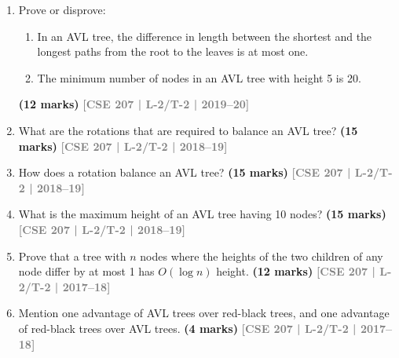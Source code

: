 \documentclass[12pt]{article}
\newcommand{\yr}[1]{\hfill\textcolor{gray}{\small\textbf{[#1]}}}
\newcommand{\mk}[1]{\textcolor{orange!70!black}{\small\textbf{(#1 marks)}}}
\begin{document}
\begin{enumerate}
\begin{center}
\end{center}
\mk{10} \yr{CSE 207 | L-2/T-2 | 2020--21}


\item Prove or disprove: 
\begin{enumerate}
\item In an AVL tree, the difference in length between the shortest and the longest paths from the root to the leaves is at most one.
\item The minimum number of nodes in an AVL tree with height 5 is 20.
\end{enumerate}
\mk{12} \yr{CSE 207 | L-2/T-2 | 2019--20}


\item What are the rotations that are required to balance an AVL tree?
\mk{15} \yr{CSE 207 | L-2/T-2 | 2018--19}


\item How does a rotation balance an AVL tree?
\mk{15} \yr{CSE 207 | L-2/T-2 | 2018--19}


\item What is the maximum height of an AVL tree having 10 nodes?
\mk{15} \yr{CSE 207 | L-2/T-2 | 2018--19}


\item Prove that a tree with $n$ nodes where the heights of the two children of any node differ by at most 1 has $O(\log n)$ height. \mk{12}
\yr{CSE 207 | L-2/T-2 | 2017--18}


\item Mention one advantage of AVL trees over red-black trees, and one advantage of red-black trees over AVL trees. \mk{4}
\yr{CSE 207 | L-2/T-2 | 2017--18}



\end{enumerate}
\end{document}
